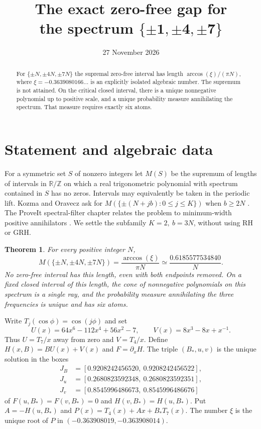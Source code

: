 \documentclass[11pt]{article}
\title{The exact zero-free gap for\\the spectrum \(\boldsymbol{\{\pm1,\pm4,\pm7\}}\)}
\author{}
\date{27 November 2026}
\newtheorem{theorem}{Theorem}
\begin{document}
\maketitle
\vspace{-2em}
\begin{abstract}
For \(\{\pm N,\pm4N,\pm7N\}\) the supremal zero-free
interval has length \(\arccos(\xi)/(\pi N)\), where
\(\xi=-0.3639080166\ldots\) is an explicitly isolated algebraic
number. The supremum is not attained. On the critical closed interval,
there is a unique nonnegative polynomial up to positive scale, and a
unique probability measure annihilating the spectrum. That measure
requires exactly six atoms.
\end{abstract}

\section{Statement and algebraic data}
For a symmetric set \(S\) of nonzero integers let \(M(S)\) be the
supremum of lengths of intervals in \(\mathbb R/\mathbb Z\) on which a
real trigonometric polynomial with spectrum contained in \(S\) has no
zeros. Intervals may equivalently be taken in the periodic lift.
Kozma and Oravecz ask for \(M(\{\pm(N+jb):0\le j\le K\})\) when
\(b\ge 2N\) \cite{KO}. The ProveIt spectral-filter chapter relates the
problem to minimum-width positive annihilators \cite{P}. We settle the
subfamily \(K=2,\ b=3N\), without using RH or GRH.

\begin{theorem}
For every positive integer \(N\),
\[
 M(\{\pm N,\pm4N,\pm7N\})=\frac{\arccos(\xi)}{\pi N}
       \simeq \frac{0.6185577534840}{N}.
\]
No zero-free interval has this length, even with both endpoints removed.
On a fixed closed interval of this length, the cone of nonnegative
polynomials on this spectrum is a single ray, and the probability
measure annihilating the three frequencies is unique and has six atoms.
\end{theorem}

Write \(T_j(\cos\phi)=\cos(j\phi)\) and set
\[
 U(x)=64x^6-112x^4+56x^2-7,\qquad V(x)=8x^3-8x+x^{-1}.
\]
Thus \(U=T_7/x\) away from zero and \(V=T_4/x\). Define
\(H(x,B)=B U(x)+V(x)\) and \(F=\partial_xH\).
The triple \((B_*,u,v)\) is the unique solution in the boxes
\begin{align*}
 J_B&=[0.9208242456520,\ 0.9208242456522],\\
 J_u&=[0.2680823592348,\ 0.2680823592351],\\
 J_v&=[0.8545996486673,\ 0.8545996486676]
\end{align*}
of \(F(u,B_*)=F(v,B_*)=0\) and \(H(v,B_*)=H(u,B_*)\).
Put \(A=-H(u,B_*)\) and \(P(x)=T_4(x)+Ax+B_*T_7(x)\).
The number \(\xi\) is the unique root of \(P\) in
\((-0.363908019,-0.363908014)\).
\end{document}
